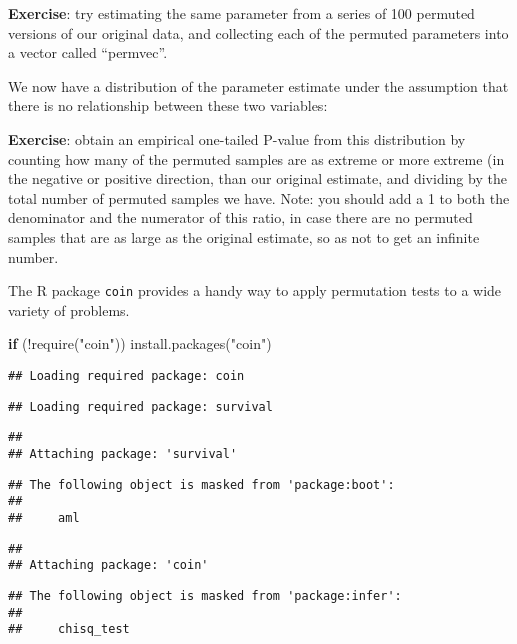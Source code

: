 \documentclass[
]{book}
\newenvironment{Shaded}{\begin{snugshade}}{\end{snugshade}}
\newcommand{\ControlFlowTok}[1]{\textcolor[rgb]{0.13,0.29,0.53}{\textbf{#1}}}
\newcommand{\FunctionTok}[1]{\textcolor[rgb]{0.00,0.00,0.00}{#1}}
\newcommand{\NormalTok}[1]{#1}
\newcommand{\SpecialCharTok}[1]{\textcolor[rgb]{0.00,0.00,0.00}{#1}}
\newcommand{\StringTok}[1]{\textcolor[rgb]{0.31,0.60,0.02}{#1}}
\begin{document}
\textbf{Exercise}: try estimating the same parameter from a series of 100 permuted versions of our original data, and collecting each of the permuted parameters into a vector called ``permvec''.

We now have a distribution of the parameter estimate under the assumption that there is no relationship between these two variables:

\textbf{Exercise}: obtain an empirical one-tailed P-value from this distribution by counting how many of the permuted samples are as extreme or more extreme (in the negative or positive direction, than our original estimate, and dividing by the total number of permuted samples we have. Note: you should add a 1 to both the denominator and the numerator of this ratio, in case there are no permuted samples that are as large as the original estimate, so as not to get an infinite number.

The R package \texttt{coin} provides a handy way to apply permutation tests to a wide variety of problems.

\begin{Shaded}
\begin{Highlighting}[]
\ControlFlowTok{if}\NormalTok{ (}\SpecialCharTok{!}\FunctionTok{require}\NormalTok{(}\StringTok{"coin"}\NormalTok{)) }\FunctionTok{install.packages}\NormalTok{(}\StringTok{"coin"}\NormalTok{)}
\end{Highlighting}
\end{Shaded}

\begin{verbatim}
## Loading required package: coin
\end{verbatim}

\begin{verbatim}
## Loading required package: survival
\end{verbatim}

\begin{verbatim}
## 
## Attaching package: 'survival'
\end{verbatim}

\begin{verbatim}
## The following object is masked from 'package:boot':
## 
##     aml
\end{verbatim}

\begin{verbatim}
## 
## Attaching package: 'coin'
\end{verbatim}

\begin{verbatim}
## The following object is masked from 'package:infer':
## 
##     chisq_test
\end{verbatim}
\end{document}
